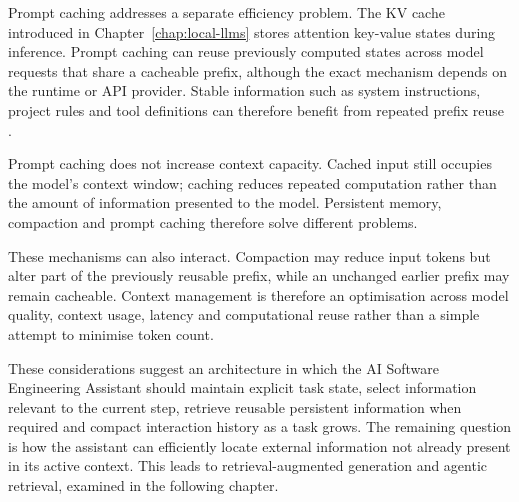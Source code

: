 Prompt caching addresses a separate efficiency problem. The KV cache introduced in Chapter~\ref{chap:local-llms} stores attention key-value states during inference. Prompt caching can reuse previously computed states across model requests that share a cacheable prefix, although the exact mechanism depends on the runtime or API provider. Stable information such as system instructions, project rules and tool definitions can therefore benefit from repeated prefix reuse \parencite{openai-prompt-caching}.

Prompt caching does not increase context capacity. Cached input still occupies the model's context window; caching reduces repeated computation rather than the amount of information presented to the model. Persistent memory, compaction and prompt caching therefore solve different problems.

These mechanisms can also interact. Compaction may reduce input tokens but alter part of the previously reusable prefix, while an unchanged earlier prefix may remain cacheable. Context management is therefore an optimisation across model quality, context usage, latency and computational reuse rather than a simple attempt to minimise token count.

These considerations suggest an architecture in which the AI Software Engineering Assistant should maintain explicit task state, select information relevant to the current step, retrieve reusable persistent information when required and compact interaction history as a task grows. The remaining question is how the assistant can efficiently locate external information not already present in its active context. This leads to retrieval-augmented generation and agentic retrieval, examined in the following chapter.
